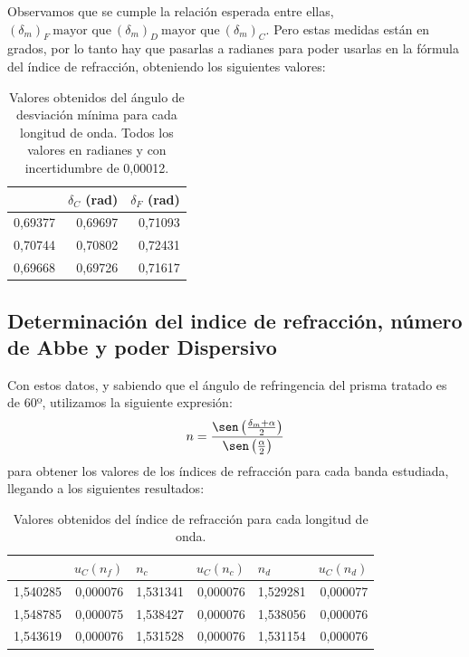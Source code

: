 \documentclass[10pt,onecolumn]{article}
\begin{document}
Observamos que se cumple la relación esperada entre ellas, $(\delta_m)_F\ \text{mayor que}\ (\delta_m)_D\ \text{mayor que}\ (\delta_m)_C$.
Pero estas medidas están en grados, por lo tanto hay que pasarlas a radianes para poder usarlas en la fórmula del índice de refracción, obteniendo los siguientes valores:

\begin{table}[H]
\centering
\begin{tabular}{|r|r|r|}
\hline
\rowcolor[rgb]{ .651,  .788,  .925}
\multicolumn{1}{|l|}{$\delta_D$ (rad)} & \multicolumn{1}{l|}{$\delta_C$ (rad)} & \multicolumn{1}{l|}{$\delta_F$ (rad)} \\ \hline
\rowcolor[rgb]{.816,  .816,  .816}0,69377 & 0,69697 & 0,71093 \\ \hline
\rowcolor[rgb]{.816,  .816,  .816}0,70744 & 0,70802 & 0,72431 \\ \hline
\rowcolor[rgb]{.816,  .816,  .816}0,69668 & 0,69726 & 0,71617 \\ \hline
\end{tabular}
\caption{Valores obtenidos del ángulo de desviación mínima para cada longitud de onda. Todos los valores en radianes y con incertidumbre de 0,00012.}\label{tab:delta_rad}
\end{table}

\subsection{Determinación del indice de refracción, número de Abbe y poder Dispersivo}

Con estos datos, y sabiendo que el ángulo de refringencia del prisma tratado es de 60º,
utilizamos la siguiente expresión: 
\[
n = \frac{\sen\left( \frac{\delta_m + \alpha}{2} \right)}{\sen\left( \frac{\alpha}{2} \right)}
\]
 para obtener los valores de los índices de refracción para cada banda estudiada, llegando a los siguientes resultados: 

\begin{table}[H]
\centering
\begin{tabular}{|r|r|r|r|r|r|}
\hline
\rowcolor[rgb]{ .651,  .788,  .925}
\multicolumn{1}{|l|}{$n_f$} & \multicolumn{1}{l|}{$u_C(n_f)$} & \multicolumn{1}{l|}{$n_c$} & \multicolumn{1}{l|}{$u_C(n_c)$} & \multicolumn{1}{l|}{$n_d$} & \multicolumn{1}{l|}{$u_C(n_d)$} \\ \hline
\rowcolor[rgb]{.816,  .816,  .816}1,540285 & 0,000076 & 1,531341 & 0,000076 & 1,529281 & 0,000077 \\ \hline
\rowcolor[rgb]{.816,  .816,  .816}1,548785 & 0,000075 & 1,538427 & 0,000076 & 1,538056 & 0,000076 \\ \hline
\rowcolor[rgb]{.816,  .816,  .816}1,543619 & 0,000076 & 1,531528 & 0,000076 & 1,531154 & 0,000076 \\ \hline
\end{tabular}
\caption{Valores obtenidos del índice de refracción para cada longitud de onda.}\label{tab:indice_refraccion}
\end{table}
\end{document}
